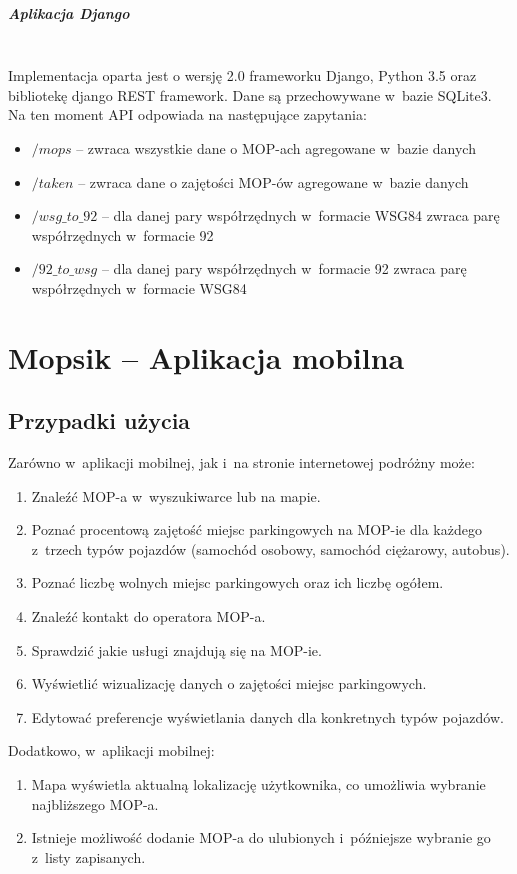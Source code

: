 \paragraph{Aplikacja Django}\mbox{}\\
Implementacja oparta jest o wersję 2.0 frameworku Django, Python 3.5 oraz bibliotekę django REST framework. Dane są przechowywane w~bazie SQLite3. Na ten moment API odpowiada na następujące zapytania:
\begin{itemize}
\item $/mops$ -- zwraca wszystkie dane o MOP-ach agregowane w~bazie danych
\item $/taken$ -- zwraca dane o zajętości MOP-ów agregowane w~bazie danych
\item $/wsg\_to\_92$ -- dla danej pary współrzędnych w~formacie WSG84 zwraca parę współrzędnych w~formacie 92
\item $/92\_to\_wsg$ -- dla danej pary współrzędnych w~formacie 92 zwraca parę współrzędnych w~formacie WSG84
\end{itemize}


\chapter{Mopsik -- Aplikacja mobilna}
\label{mopsik_mobile}

\section{Przypadki użycia}
\label{mopsik_usecase}
Zarówno w~aplikacji mobilnej, jak i~na stronie internetowej podróżny może:
\begin{enumerate}
\item Znaleźć MOP-a w~wyszukiwarce lub na mapie.
\item Poznać procentową zajętość miejsc parkingowych na MOP-ie dla każdego z~trzech typów pojazdów (samochód osobowy, samochód ciężarowy, autobus).
\item Poznać liczbę wolnych miejsc parkingowych oraz ich liczbę ogółem.
\item Znaleźć kontakt do operatora MOP-a.
\item Sprawdzić jakie usługi znajdują się na MOP-ie.
\item Wyświetlić wizualizację danych o zajętości miejsc parkingowych.
\item Edytować preferencje wyświetlania danych dla konkretnych typów pojazdów.
\end{enumerate}
Dodatkowo, w~aplikacji mobilnej:
\begin{enumerate}
\item Mapa wyświetla aktualną lokalizację użytkownika, co umożliwia wybranie najbliższego MOP-a. 
\item Istnieje możliwość dodanie MOP-a do ulubionych i~późniejsze wybranie go z~listy zapisanych.
\end{enumerate}


